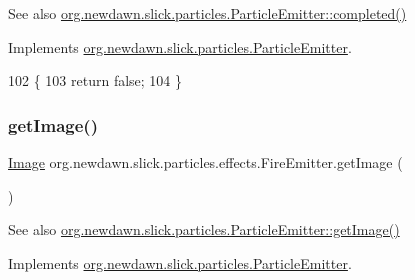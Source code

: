 \begin{DoxySeeAlso}{See also}
\mbox{\hyperlink{interfaceorg_1_1newdawn_1_1slick_1_1particles_1_1_particle_emitter_a6741f9cbee46594a774b1bfd24a4bf3d}{org.\+newdawn.\+slick.\+particles.\+Particle\+Emitter\+::completed()}} 
\end{DoxySeeAlso}


Implements \mbox{\hyperlink{interfaceorg_1_1newdawn_1_1slick_1_1particles_1_1_particle_emitter_a6741f9cbee46594a774b1bfd24a4bf3d}{org.\+newdawn.\+slick.\+particles.\+Particle\+Emitter}}.


\begin{DoxyCode}
102                                \{
103         \textcolor{keywordflow}{return} \textcolor{keyword}{false};
104     \}
\end{DoxyCode}
\mbox{\label{classorg_1_1newdawn_1_1slick_1_1particles_1_1effects_1_1_fire_emitter_afa45cb540a0c320d45c530d499d6eae3}} 
\subsubsection{\texorpdfstring{get\+Image()}{getImage()}}
{\footnotesize\ttfamily \mbox{\hyperlink{classorg_1_1newdawn_1_1slick_1_1_image}{Image}} org.\+newdawn.\+slick.\+particles.\+effects.\+Fire\+Emitter.\+get\+Image (\begin{DoxyParamCaption}{ }\end{DoxyParamCaption})\hspace{0.3cm}{\ttfamily [inline]}}

\begin{DoxySeeAlso}{See also}
\mbox{\hyperlink{interfaceorg_1_1newdawn_1_1slick_1_1particles_1_1_particle_emitter_a8a4c81c409b505d6708519c492660746}{org.\+newdawn.\+slick.\+particles.\+Particle\+Emitter\+::get\+Image()}} 
\end{DoxySeeAlso}


Implements \mbox{\hyperlink{interfaceorg_1_1newdawn_1_1slick_1_1particles_1_1_particle_emitter_a8a4c81c409b505d6708519c492660746}{org.\+newdawn.\+slick.\+particles.\+Particle\+Emitter}}.


